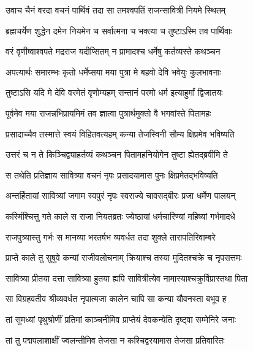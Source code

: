 \twolineshloka
{उवाच चैनं वरदा वचनं पार्थिवं तदा}
{सा तमश्वपतिं राजन्सावित्री नियमे स्थितम्}


\twolineshloka
{ब्रह्मचर्येण शुद्धेन दमेन नियमेन च}
{सर्वात्मना च भक्त्या च तुष्टाऽस्मि तव पार्थिवाः}


\twolineshloka
{वरं वृणीष्वाश्वपते मद्रराज यदीप्सितम्}
{न प्रामादश्च धर्मेषु कर्तव्यस्ते कथञ्चन}




\twolineshloka
{अपत्यार्थः समारम्भः कृतो धर्मेप्सया मया}
{पुत्रा मे बहवो देवि भवेयुः कुलभावनाः}


\twolineshloka
{तुष्टाऽसि यदि मे देवि वरमेतं वृणोम्यहम्}
{सन्तानं परमो धर्म इत्याहुर्मां द्विजातयः}




\twolineshloka
{पूर्वमेव मया राजन्नभिप्रायमिमं तव}
{ज्ञात्वा पुत्रार्थमुक्तो वै भगवांस्ते पितामहः}


\twolineshloka
{प्रसादाच्चैव तस्मात्ते स्वयं विहितवत्यहम्}
{कन्या तेजस्विनी सौम्य क्षिप्रमेव भविष्यति}


\twolineshloka
{उत्तरं च न ते किञ्चिद्व्याहर्तव्यं कथञ्चन}
{पितामहनियोगेन तुष्टा ह्येतद्ब्रवीमि ते}


\twolineshloka
{स तथेति प्रतिज्ञाय सावित्र्या वचनं नृपः}
{प्रसादयामास पुनः क्षिप्रमेतद्भविष्यति}


\twolineshloka
{अन्तर्हितायां सावित्र्यां जगाम स्वपुरं नृपः}
{स्वराज्ये चावसद्बीरः प्रजा धर्मेण पालयन्}


\twolineshloka
{कस्मिंश्चित्तु गते काले स राजा नियतब्रतः}
{ज्येष्ठायां धर्मचारिण्यां महिष्यां गर्भमादधे}


\twolineshloka
{राजपुत्र्यास्तु गर्भः स मानव्या भरतर्षभ}
{व्यवर्धत तदा शुक्ले तारापतिरिवाम्बरे}


\twolineshloka
{प्राप्ते काले तु सुषुवे कन्यां राजीवलोचनाम्}
{क्रियाश्च तस्या मुदितश्चक्रे च नृपसत्तमः}

\twolineshloka
{सावित्र्या प्रीतया दत्ता सावित्र्या हुतया ह्यपि}
{सावित्रीत्येव नामास्याश्चक्रुर्विप्रास्तथा पिता}


\twolineshloka
{सा विग्रहवतीव श्रीव्यवर्धत नृपात्मजा}
{कालेन चापि सा कन्या यौवनस्ता बभूव ह}


\twolineshloka
{तां सुमध्यां पृथुश्रोणीं प्रतिमां काञ्चनीमिव}
{प्राप्तेयं देवकन्येति दृष्ट्वा सम्मेनिरे जनाः}


\twolineshloka
{तां तु पद्मपलाशाक्षीं ज्वलन्तीमिव तेजसा}
{न कश्चिद्वरयामास तेजसा प्रतिवारितः}


